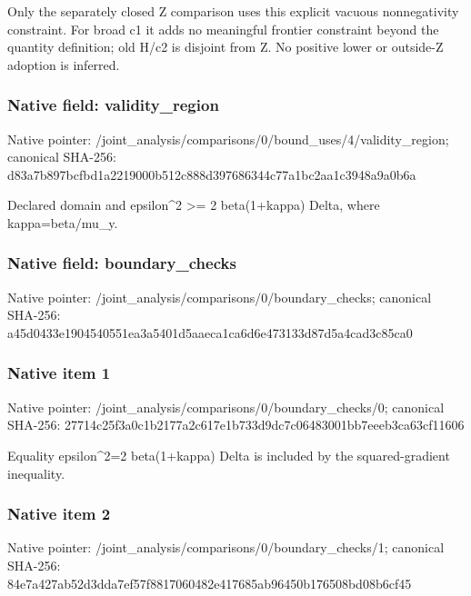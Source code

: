\documentclass[10pt,a4paper]{article}
\begin{document}
\begingroup\raggedright\sloppy Only the separately closed Z comparison uses this explicit vacuous nonnegativity constraint. For broad c1 it adds no meaningful frontier constraint beyond the quantity definition;\allowbreak{} old H/\allowbreak{}c2 is disjoint from Z. No positive lower or outside-Z adoption is inferred.\par\endgroup

\subsubsection{Native field: validity\_\allowbreak{}region}
Native pointer: /joint\_\allowbreak{}analysis/comparisons/0/bound\_\allowbreak{}uses/4/validity\_\allowbreak{}region; canonical SHA-256: d83a7b897bcfbd1a2219000b512c888d397686344c77a1bc2aa1c3948a9a0b6a

\begingroup\raggedright\sloppy Declared domain and epsilon\textasciicircum{}2 >=\allowbreak{} 2 beta(1+kappa) Delta,\allowbreak{} where kappa=\allowbreak{}beta/\allowbreak{}mu\_\allowbreak{}y.\par\endgroup

\subsubsection{Native field: boundary\_\allowbreak{}checks}
Native pointer: /joint\_\allowbreak{}analysis/comparisons/0/boundary\_\allowbreak{}checks; canonical SHA-256: a45d0433e1904540551ea3a5401d5aaeca1ca6d6e473133d87d5a4cad3c85ca0

\subsubsection{Native item 1}
Native pointer: /joint\_\allowbreak{}analysis/comparisons/0/boundary\_\allowbreak{}checks/0; canonical SHA-256: 27714c25f3a0c1b2177a2c617e1b733d9dc7c06483001bb7eeeb3ca63cf11606

\begingroup\raggedright\sloppy Equality epsilon\textasciicircum{}2=\allowbreak{}2 beta(1+kappa) Delta is included by the squared-gradient inequality.\par\endgroup

\subsubsection{Native item 2}
Native pointer: /joint\_\allowbreak{}analysis/comparisons/0/boundary\_\allowbreak{}checks/1; canonical SHA-256: 84e7a427ab52d3dda7ef57f8817060482e417685ab96450b176508bd08b6cf45
\end{document}
